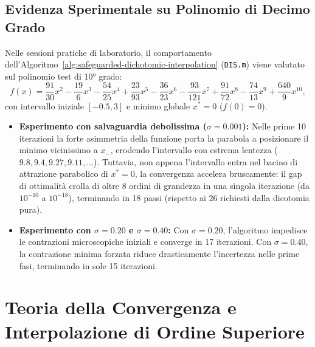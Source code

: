 \subsection{Evidenza Sperimentale su Polinomio di Decimo Grado}
Nelle sessioni pratiche di laboratorio, il comportamento dell'Algoritmo~\ref{alg:safeguarded-dichotomic-interpolation} (\texttt{DIS.m}) viene valutato sul polinomio test di 10° grado:
\begin{equation}
    f(x) = \frac{91}{30} x^2 - \frac{19}{6} x^3 - \frac{54}{25} x^4 + \frac{23}{93} x^5 - \frac{36}{23} x^6 - \frac{93}{121} x^7 + \frac{91}{72} x^8 - \frac{74}{13} x^9 + \frac{640}{9} x^{10},
    \label{eq:tenth-degree-polynomial}
\end{equation}
con intervallo iniziale $[-0.5, 3]$ e minimo globale $x^* = 0$ ($f(0) = 0$).

\begin{itemize}
    \item \textbf{Esperimento con salvaguardia debolissima ($\sigma = 0.001$):} Nelle prime 10 iterazioni la forte asimmetria della funzione porta la parabola a posizionare il minimo vicinissimo a $x_-$, erodendo l'intervallo con estrema lentezza ($9.8, 9.4, 9.27, 9.11, \dots$). Tuttavia, non appena l'intervallo entra nel bacino di attrazione parabolico di $x^* = 0$, la convergenza accelera bruscamente: il gap di ottimalit\`a crolla di oltre 8 ordini di grandezza in una singola iterazione (da $10^{-10}$ a $10^{-18}$), terminando in 18 passi (rispetto ai 26 richiesti dalla dicotomia pura).
    \item \textbf{Esperimento con $\sigma = 0.20$ e $\sigma = 0.40$:} Con $\sigma = 0.20$, l'algoritmo impedisce le contrazioni microscopiche iniziali e converge in 17 iterazioni. Con $\sigma = 0.40$, la contrazione minima forzata riduce drasticamente l'incertezza nelle prime fasi, terminando in sole 15 iterazioni.
\end{itemize}

\FloatBarrier
\section{Teoria della Convergenza e Interpolazione di Ordine Superiore}
\label{sec:univariata-teoria-convergenza}

